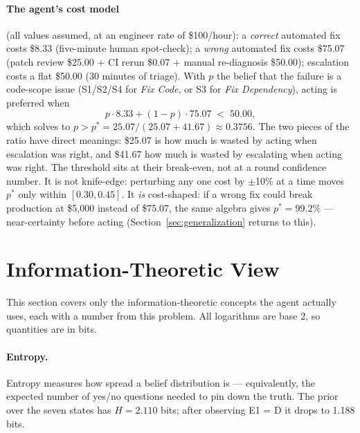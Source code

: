 \documentclass{article}
\begin{document}
\paragraph{The agent's cost model} (all values assumed, at an engineer rate of \$100/hour): a \emph{correct} automated fix costs \$8.33 (five-minute human spot-check); a \emph{wrong} automated fix costs \$75.07 (patch review \$25.00 + CI rerun \$0.07 + manual re-diagnosis \$50.00); escalation costs a flat \$50.00 (30 minutes of triage). With $p$ the belief that the failure is a code-scope issue (S1/S2/S4 for \emph{Fix Code}, or S3 for \emph{Fix Dependency}), acting is preferred when
\begin{equation}
p \cdot 8.33 + (1-p) \cdot 75.07 \;<\; 50.00,
\end{equation}
which solves to $p > p^{*} = 25.07 / (25.07 + 41.67) \approx 0.3756$.
The two pieces of the ratio have direct meanings: \$25.07 is how much is wasted by acting when escalation was right, and \$41.67 how much is wasted by escalating when acting was right. The threshold sits at their break-even, not at a round confidence number. It is not knife-edge: perturbing any one cost by $\pm$10\% at a time moves $p^*$ only within $[0.30, 0.45]$. It \emph{is} cost-shaped: if a wrong fix could break production at \$5{,}000 instead of \$75.07, the same algebra gives $p^* = 99.2\%$ --- near-certainty before acting (Section~\ref{sec:generalization} returns to this).

\section{Information-Theoretic View}
\label{sec:info}

This section covers only the information-theoretic concepts the agent actually uses, each with a number from this problem. All logarithms are base 2, so quantities are in bits.

\paragraph{Entropy.} Entropy measures how spread a belief distribution is --- equivalently, the expected number of yes/no questions needed to pin down the truth. The prior over the seven states has $H = 2.110$ bits; after observing E1 = D it drops to 1.188 bits.
\end{document}
